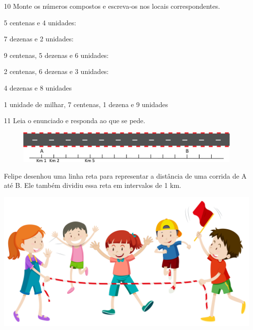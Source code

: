 \num{10} Monte os números compostos e escreva-os nos locais correspondentes.
\enlargethispage{\baselineskip}

\begin{escolha}
\item 5 centenas e 4 unidades:

\item 7 dezenas e 2 unidades:

\item 9 centenas, 5 dezenas e 6 unidades:

\item 2 centenas, 6 dezenas e 3 unidades:

\item 4 dezenas e 8 unidades

\item 1 unidade de milhar, 7 centenas, 1 dezena e 9 unidades

\end{escolha}


\num{11} Leia o enunciado e responda ao que se pede. 

\vspace{1em}

\begin{figure}[htpb!]
\centering
\includegraphics[width=\textwidth]{./media/image6.png}
\end{figure}

\vspace{1em}

Felipe desenhou uma linha reta para representar a distância de uma corrida de A até B. Ele também dividiu essa reta em intervalos de 1 km. 

\includegraphics[width=\textwidth]{./media/image6a.jpeg}

